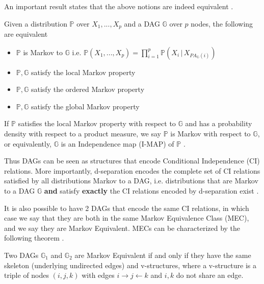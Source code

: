 \documentclass{tufte-book}
\begin{document}
An important result states that the above notions are indeed equivalent \cite{duarte-2020-algeb-geomet}.

\begin{theorem}\label{thm:markovdag}
Given a distribution $\mathbb{P}$ over $X_1,...,X_p$ and a DAG $\mathbb{G}$ over $p$ nodes, the following are equivalent

\begin{itemize}
\item $\mathbb{P}$ is Markov to $\mathbb{G}$ i.e. $\mathbb{P}(X_1,...,X_p) = \prod_{i=1}^p \mathbb{P}(X_i \, |\, X_{PA_{\mathbb{G}}(i)})$
\item $\mathbb{P}, \mathbb{G}$ satisfy the local Markov property
\item $\mathbb{P}, \mathbb{G}$ satisfy the ordered Markov property
\item $\mathbb{P}, \mathbb{G}$ satisfy the global Markov property
\end{itemize}

\end{theorem}


If \(\mathbb{P}\) satisfies the local Markov property with respect to \(\mathbb{G}\) and has a probability density with respect to a product measure, we say \(\mathbb{P}\) is Markov with respect to \(\mathbb{G}\), or equivalently, \(\mathbb{G}\) is an Independence map (I-MAP) of \(\mathbb{P}\) \cite{lauritzen-1996-graph}.

Thus DAGs can be seen as structures that encode Conditional Independence (CI) relations. More importantly, d-separation encodes the complete set of CI relations satisfied by all distributions Markov to a DAG, i.e. distributions that are Markov to a DAG \(\mathbb{G}\) \textbf{and} satisfy \textbf{exactly} the CI relations encoded by d-separation exist \cite{meek-1995-stron-compl,geiger-1990-ident-indep}.

It is also possible to have 2 DAGs that encode the same CI relations, in which case we say that they are both in the same Markov Equivalence Class (MEC), and we say they are Markov Equivalent. MECs can be characterized by the following theorem \cite{verma-2013-equiv-causal-model}.

\begin{theorem}\label{thm:vermapearl}
Two DAGs $\mathbb{G}_1$ and $\mathbb{G}_2$ are Markov Equivalent if and only if they have the same skeleton (underlying undirected edges) and v-structures, where a v-structure is a triple of nodes $(i,j,k)$ with edges $i \rightarrow j \leftarrow k$ and $i,k$ do not share an edge.
\end{theorem}
\end{document}
